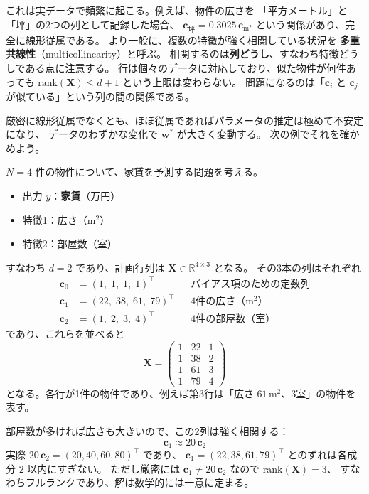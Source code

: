 これは実データで頻繁に起こる。例えば、物件の広さを
「平方メートル」と「坪」の2つの列として記録した場合、
$\bm{c}_{\text{坪}} = 0.3025\,\bm{c}_{\text{m}^2}$ という関係があり、完全に線形従属である。
より一般に、複数の特徴が強く相関している状況を
\textbf{多重共線性}（multicollinearity）と呼ぶ。
相関するのは\textbf{列どうし}、すなわち特徴どうしである点に注意する。
行は個々のデータに対応しており、似た物件が何件あっても
$\mathrm{rank}(\bm{X}) \leq d+1$ という上限は変わらない。
問題になるのは「$\bm{c}_i$ と $\bm{c}_j$ が似ている」という列の間の関係である。

厳密に線形従属でなくとも、ほぼ従属であればパラメータの推定は極めて不安定になり、
データのわずかな変化で $\bm{w}^*$ が大きく変動する。
次の例でそれを確かめよう。


$N = 4$ 件の物件について、家賃を予測する問題を考える。
\begin{itemize}
  \item 出力 $y$：\textbf{家賃}（万円）
  \item 特徴1：広さ（$\mathrm{m}^2$）
  \item 特徴2：部屋数（室）
\end{itemize}
すなわち $d = 2$ であり、計画行列は $\bm{X} \in \mathbb{R}^{4 \times 3}$ となる。
その3本の列はそれぞれ
\begin{align*}
  \bm{c}_0 &= (1,\; 1,\; 1,\; 1)^\top && \text{バイアス項のための定数列} \\
  \bm{c}_1 &= (22,\; 38,\; 61,\; 79)^\top && \text{4件の広さ（$\mathrm{m}^2$）} \\
  \bm{c}_2 &= (1,\; 2,\; 3,\; 4)^\top && \text{4件の部屋数（室）}
\end{align*}
であり、これらを並べると
\begin{equation*}
  \bm{X} = \begin{pmatrix}
    1 & 22 & 1 \\
    1 & 38 & 2 \\
    1 & 61 & 3 \\
    1 & 79 & 4
  \end{pmatrix}
\end{equation*}
となる。各行が1件の物件であり、例えば第3行は「広さ $61\,\mathrm{m}^2$、3室」の物件を表す。

部屋数が多ければ広さも大きいので、この2列は強く相関する：
\begin{equation*}
  \bm{c}_1 \approx 20\,\bm{c}_2
\end{equation*}
実際 $20\,\bm{c}_2 = (20, 40, 60, 80)^\top$ であり、
$\bm{c}_1 = (22, 38, 61, 79)^\top$ とのずれは各成分 $2$ 以内にすぎない。
ただし厳密には $\bm{c}_1 \neq 20\,\bm{c}_2$ なので $\mathrm{rank}(\bm{X}) = 3$、
すなわちフルランクであり、解は数学的には一意に定まる。

